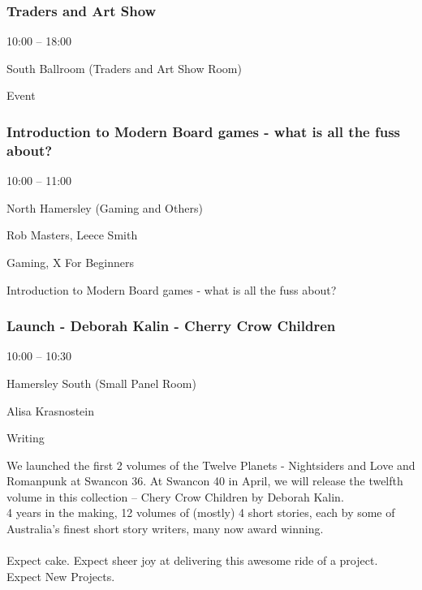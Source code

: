 \documentclass{scrreprt}
\begin{document}
\begin{multicols}{2}
\subsubsection*{Traders and Art Show}\begin{description}
\setlength{\itemsep}{0pt}
\setlength{\parsep}{0pt}
\setlength{\parskip}{0pt}
\item[Time:]{10:00 -- 18:00}
\item[Venue:]{South Ballroom (Traders and Art Show Room)}
\item[Tags:]{Event}\end{description}

\subsubsection*{Introduction to Modern Board games - what is all the fuss about?}\begin{description}
\setlength{\itemsep}{0pt}
\setlength{\parsep}{0pt}
\setlength{\parskip}{0pt}
\item[Time:]{10:00 -- 11:00}
\item[Venue:]{North Hamersley (Gaming and Others)}
\item[People:]{Rob Masters, Leece Smith}
\item[Tags:]{Gaming, X For Beginners}\end{description}
Introduction to Modern Board games - what is all the fuss about?
\subsubsection*{Launch - Deborah Kalin - Cherry Crow Children}\begin{description}
\setlength{\itemsep}{0pt}
\setlength{\parsep}{0pt}
\setlength{\parskip}{0pt}
\item[Time:]{10:00 -- 10:30}
\item[Venue:]{Hamersley South (Small Panel Room)}
\item[People:]{Alisa Krasnostein}
\item[Tags:]{Writing}\end{description}
We launched the first 2 volumes of the Twelve Planets - Nightsiders and Love and Romanpunk at Swancon 36. At Swancon 40 in April, we will release the twelfth volume in this collection – Chery Crow Children by Deborah Kalin.\\4 years in the making, 12 volumes of (mostly) 4 short stories, each by some of Australia’s finest short story writers, many now award winning.\\\\Expect cake. Expect sheer joy at delivering this awesome ride of a project. Expect New Projects.

\end{multicols}
\end{document}
